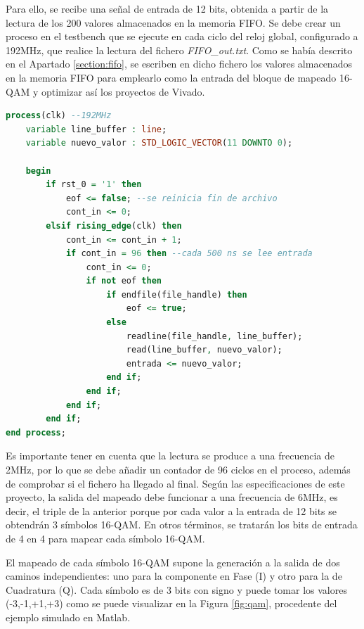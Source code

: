\vspace{3mm}

Para ello, se recibe una señal de entrada de 12 bits, obtenida a partir de la lectura de los 200 valores almacenados en la memoria FIFO. Se debe crear un proceso en el testbench que se ejecute en cada ciclo del reloj global, configurado a 192MHz, que realice la lectura del fichero \textit{FIFO\_out.txt}. Como se había descrito en el Apartado \ref{section:fifo}, se escriben en dicho fichero los valores almacenados en la memoria FIFO para emplearlo como la entrada del bloque de mapeado 16-QAM y optimizar así los proyectos de Vivado.

\vspace{5mm}

\begin{lstlisting}[language=VHDL, style=mystyle, caption={Proceso de lectura del fichero FIFO\_out.txt}]
	process(clk) --192MHz
    variable line_buffer : line;
    variable nuevo_valor : STD_LOGIC_VECTOR(11 DOWNTO 0);
    
    begin
        if rst_0 = '1' then
            eof <= false; --se reinicia fin de archivo
            cont_in <= 0;
        elsif rising_edge(clk) then
            cont_in <= cont_in + 1;
            if cont_in = 96 then --cada 500 ns se lee entrada
                cont_in <= 0;
                if not eof then
                    if endfile(file_handle) then 
                        eof <= true; 
                    else
                        readline(file_handle, line_buffer);
                        read(line_buffer, nuevo_valor);
                        entrada <= nuevo_valor;
                    end if;
                end if;
            end if;                      
        end if;
end process;  
\end{lstlisting}

\vspace{2mm}

Es importante tener en cuenta que la lectura se produce a una frecuencia de 2MHz, por lo que se debe añadir un contador de 96 ciclos en el proceso, además de comprobar si el fichero ha llegado al final. Según las especificaciones de este proyecto, la salida del mapeado debe funcionar a una frecuencia de 6MHz, es decir, el triple de la anterior porque por cada valor a la entrada de 12 bits se obtendrán 3 símbolos 16-QAM. En otros términos, se tratarán los bits de entrada de 4 en 4 para mapear cada símbolo 16-QAM. 

El mapeado de cada símbolo 16-QAM supone la generación a la salida de dos caminos independientes: uno para la componente en Fase (I) y otro para la de Cuadratura (Q). Cada símbolo es de 3 bits con signo y puede tomar los valores (-3,-1,+1,+3) como se puede visualizar en la Figura \ref{fig:qam}, procedente del ejemplo simulado en Matlab.

